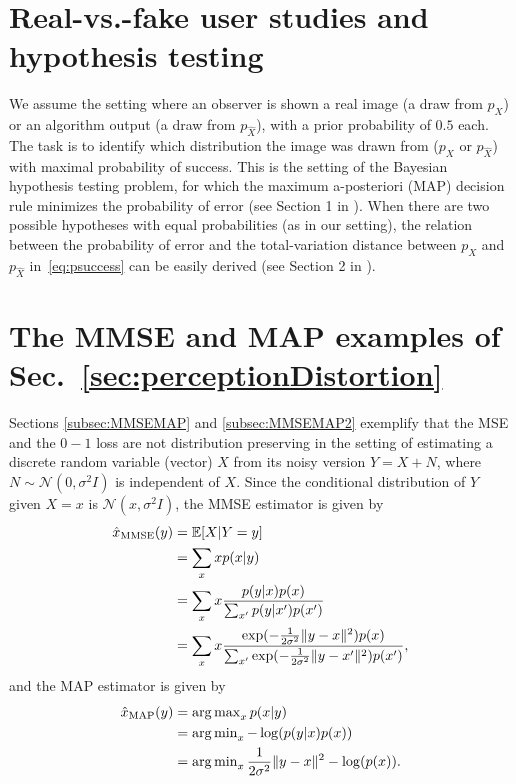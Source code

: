 \appendices

\section{Real-vs.-fake user studies and hypothesis testing}\label{ap:real-vs-fake}
We assume the setting where an observer is shown a real image (a draw from $p_X$) or an algorithm output (a draw from $p_{\hat{X}}$), with a prior probability of  $0.5$ each. The task is to identify which distribution the image was drawn from ($p_X$ or $p_{\hat{X}}$) with maximal probability of success. This is the setting of the Bayesian hypothesis testing problem, for which the maximum a-posteriori (MAP) decision rule minimizes the probability of error (see Section 1 in \cite{nielsen2013hypothesis}). When there are two possible hypotheses with equal probabilities (as in our setting), the relation between the probability of error and the total-variation distance between $p_X$ and $p_{\hat{X}}$ in~\eqref{eq:psuccess} can be easily derived (see Section 2 in \cite{nielsen2013hypothesis}).


\section{The MMSE and MAP examples of Sec.~\ref{sec:perceptionDistortion}}\label{ap:MMSE-MAP}
Sections \ref{subsec:MMSEMAP} and \ref{subsec:MMSEMAP2} exemplify that the MSE and the $0-1$ loss are not distribution preserving in the setting of estimating a discrete random variable (vector) $X$ from its noisy version $Y=X+N$, where $N\sim \mathcal{N}(0,\sigma^2 I)$ is independent of $X$. Since the conditional distribution of $Y$ given $X=x$ is $\mathcal{N}(x,\sigma^2 I)$, the MMSE estimator is given by
\begin{align}
\hat{x}_{\text{MMSE}} (y) &= \mathbb{E}[X \vert Y=y] \nonumber \\
&= \sum_x x p(x \vert y)  \nonumber \\
&= \sum_x x \frac{  p(y \vert x)p(x)}{\sum_{x'} p(y \vert x')p(x')} \nonumber \\
&= \sum_x x \frac{\exp(-\frac{1}{2\sigma^2}\|y-x\|^2)p(x)}{\sum_{x'} \exp(-\frac{1}{2\sigma^2}\|y-x'\|^2)p(x')},
\end{align}
and the MAP estimator is given by
\begin{align}
\hat{x}_{\text{MAP}}(y) &= \operatorname{\arg\max}_x p(x \vert y) \nonumber \\
&= \operatorname{\arg\min}_x -\log (p(y \vert x) p(x)) \nonumber \\
&= \operatorname{\arg\min}_x \frac{1}{2\sigma^2}\|y-x\|^2 - \log (p(x)).
\end{align}


